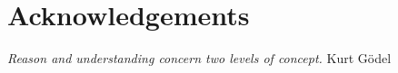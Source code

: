 \chapter*{Acknowledgements}



\begin{flushright}
\textit{Reason and understanding concern two levels of concept.}
Kurt Gödel
\end{flushright}
